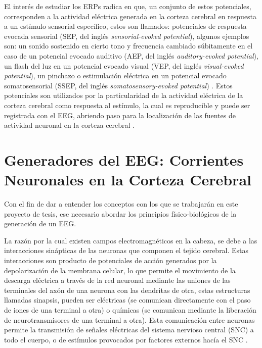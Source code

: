 El interés de estudiar los ERPs radica en que, un conjunto de estos potenciales, corresponden a la actividad eléctrica generada en la corteza cerebral en respuesta a un estímulo sensorial específico, estos son llamados: potenciales de respuesta evocada sensorial (SEP, del inglés \emph{sensorial-evoked potential}), algunos ejemplos son: un sonido sostenido en cierto tono y frecuencia cambiado súbitamente en el caso de un potencial evocado auditivo (AEP, del inglés \emph{auditory-evoked potential}), un flash del luz en un potencial evocado visual (VEP, del inglés \emph{visual-evoked potential}), un pinchazo o estimulación eléctrica en un potencial evocado somatosensorial (SSEP, del inglés \emph{somatosensory-evoked potential}) \cite{kreutzerEncyclopediaClinicalNeuropsychology2011}.
Estos potenciales son utilizados por la particularidad de la actividad eléctrica de la corteza cerebral como respuesta al estímulo, la cual es reproducible y puede ser registrada con el EEG, abriendo paso para la localización de las fuentes de actividad neuronal en la corteza cerebral \cite{luckIntroductionEventrelatedPotential2014}.

\section{Generadores del EEG: Corrientes Neuronales en la Corteza Cerebral}
\label{sec:intro:generators}

Con el fin de dar a entender los conceptos con los que se trabajarán en este proyecto de tesis, ese necesario abordar los principios físico-biológicos de la generación de un EEG.

La razón por la cual existen campos electromagnéticos en la cabeza, se debe a las interacciones sinápticas de las neuronas que componen el tejido cerebral.
Estas interacciones son producto de potenciales de acción generados por la depolarización de la membrana celular, lo que permite el movimiento de la descarga eléctrica a través de la red neuronal mediante las uniones de las terminales del axón de una neurona con las dendritas de otra, estas estructuras llamadas sinapsis, pueden ser eléctricas (se comunican directamente con el paso de iones de una terminal a otra) o químicas (se comunican mediante la liberación de neurotransmisores de una terminal a otra).
Esta comunicación entre neuronas permite la transmisión de señales eléctricas del sistema nervioso central (SNC) a todo el cuerpo, o de estímulos provocados por factores externos hacía el SNC \cite{kandelPrinciplesNeuralScience2013}.

